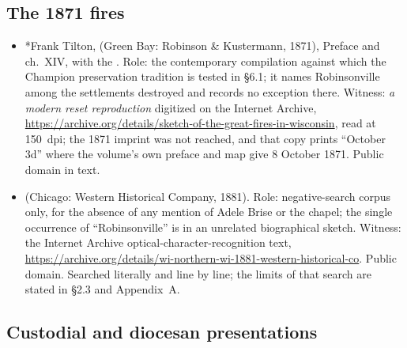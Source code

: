 \subsection*{The 1871 fires}

\begin{itemize}
\item *Frank Tilton,  (Green Bay: Robinson \& Kustermann, 1871),
Preface and ch.~XIV, with the . Role: the contemporary compilation against which the
Champion preservation tradition is tested in \S6.1; it names
Robinsonville among the settlements destroyed and records no exception
there. Witness: \emph{a modern reset reproduction} digitized on the
Internet Archive,
\url{https://archive.org/details/sketch-of-the-great-fires-in-wisconsin},
read at 150~dpi; the 1871 imprint was not reached, and that copy prints
``October 3d'' where the volume's own preface and map give 8 October
1871. Public domain in text.
\item {} (Chicago: Western Historical
Company, 1881). Role: negative-search corpus only, for the absence of
any mention of Adele Brise or the chapel; the single occurrence of
``Robinsonville'' is in an unrelated biographical sketch. Witness: the
Internet Archive optical-character-recognition text,
\url{https://archive.org/details/wi-northern-wi-1881-western-historical-co}.
Public domain. Searched literally and line by line; the limits of that
search are stated in \S2.3 and Appendix~A.
\end{itemize}

\subsection*{Custodial and diocesan presentations}


